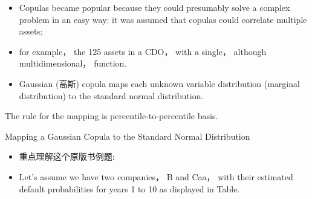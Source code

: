    \begin{itemize}
    \item Copulas became popular because they could presumably solve a complex problem in an easy way: it was assumed that copulas could correlate multiple assets;
    \end{itemize}
    
    \begin{itemize}
    \item for example， the 125 assets in a CDO， with a single， although multidimensional， function.
    \end{itemize}
    
    \begin{itemize}
    \item Gaussian (高斯) copula maps each unknown variable distribution (marginal distribution) to the standard normal distribution.
    \end{itemize}
    
     The rule for the mapping is percentile-to-percentile basis.
    
     Mapping a Gaussian Copula to the Standard Normal Distribution
    
    \begin{itemize}
    \item 重点理解这个原版书例题:
    \end{itemize}
    
    \begin{itemize}
    \item Let's assume we have two companies， B and Caa， with their estimated default probabilities for years 1 to 10 as displayed in Table.
    \end{itemize}
    
